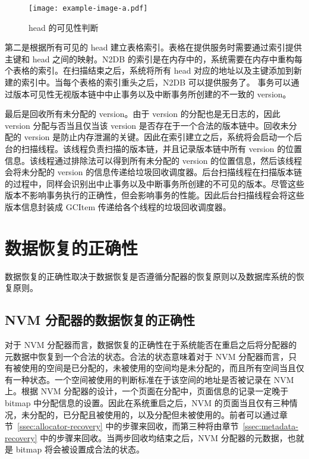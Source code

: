 \begin{figure}[ht]
    \centering
    \texttt{[image: example-image-a.pdf]}
    \caption{head 的可见性判断}
    \label{fig:head-visibility}
\end{figure}

第二是根据所有可见的 head 建立表格索引。表格在提供服务时需要通过索引提供主键和 head 之间的映射。N2DB 的索引是在内存中的，系统需要在内存中重构每个表格的索引。在扫描结束之后，系统将所有 head 对应的地址以及主键添加到新建的索引中。当每个表格的索引重头之后，N2DB 可以提供服务了。
事务可以通过版本可见性无视版本链中中止事务以及中断事务所创建的不一致的 version。

最后是回收所有未分配的 version。由于 version 的分配也是无日志的，因此 version 分配与否当且仅当该 version 是否存在于一个合法的版本链中。回收未分配的 version 是防止内存泄漏的关键。因此在索引建立之后，系统将会启动一个后台的扫描线程。该线程负责扫描的版本链，并且记录版本链中所有 version 的位置信息。该线程通过排除法可以得到所有未分配的 version 的位置信息，然后该线程会将未分配的 version 的信息传递给垃圾回收调度器。后台扫描线程在扫描版本链的过程中，同样会识别出中止事务以及中断事务所创建的不可见的版本。尽管这些版本不影响事务执行的正确性，但会影响事务的性能。因此后台扫描线程会将这些版本信息封装成 GCItem 传递给各个线程的垃圾回收调度器。



\section{数据恢复的正确性}

数据恢复的正确性取决于数据恢复是否遵循分配器的恢复原则以及数据库系统的恢复原则。

\subsection{NVM 分配器的数据恢复的正确性}

对于 NVM 分配器而言，数据恢复的正确性在于系统能否在重启之后将分配器的元数据中恢复到一个合法的状态。合法的状态意味着对于 NVM 分配器而言，只有被使用的空间是已分配的，未被使用的空间均是未分配的，而且所有空间当且仅有一种状态。一个空间被使用的判断标准在于该空间的地址是否被记录在 NVM 上。根据 NVM 分配器的设计，一个页面在分配中，页面信息的记录一定晚于 bitmap 中分配信息的设置。因此在系统重启之后，NVM 的页面当且仅有三种情况，未分配的，已分配且被使用的，以及分配但未被使用的。前者可以通过章节~\ref{ssec:allocator-recovery} 中的步骤来回收，而第三种将由章节~\ref{ssec:metadata-recovery} 中的步骤来回收。当两步回收均结束之后，NVM 分配器的元数据，也就是 bitmap 将会被设置成合法的状态。

